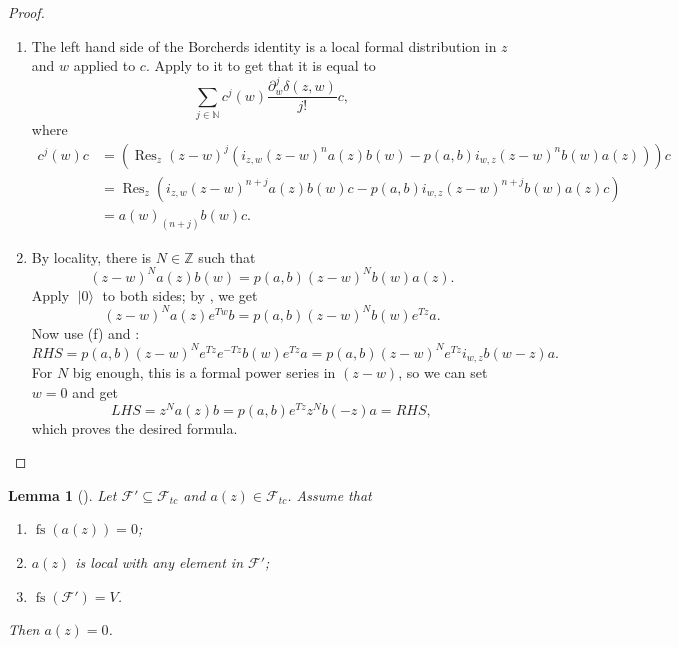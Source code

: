 \documentclass[a4paper, 12pt, reqno]{amsart}
\newtheorem{lemma}[theorem]{Lemma}
\theoremstyle{remark}
\numberwithin{equation}{subsection}
\DeclareMathOperator{\Res}{Res}
\DeclareMathOperator{\vac}{|0\rangle}
\DeclareMathOperator{\fs}{fs}
\begin{document}
\begin{proof}
\begin{enumerate}
  \item The left hand side of the Borcherds identity is a local formal distribution in $z$ and $w$ applied to $c$.
    Apply  to it to get that it is equal to
    \begin{equation*}
      \sum_{j \in \mathbb{N}} c^j(w)\frac{\partial^j_w\delta(z,w)}{j!}c,
    \end{equation*}
    where
    \begin{align*}
      c^j(w)c &= (\Res_z(z - w)^j(i_{z, w}(z - w)^na(z)b(w) - p(a, b)i_{w, z}(z - w)^nb(w)a(z)))c \\
      &= \Res_z(i_{z, w}(z - w)^{n + j}a(z)b(w)c - p(a, b)i_{w, z}(z - w)^{n + j}b(w)a(z)c) \\
      &= a(w)_{(n + j)}b(w)c.
    \end{align*}
  \item By locality, there is $N \in \mathbb{Z}$ such that
    \begin{equation*}
      (z - w)^Na(z)b(w) = p(a, b)(z - w)^Nb(w)a(z).
    \end{equation*}
    Apply $\vac$ to both sides; by , we get
    \begin{equation*}
      (z - w)^Na(z)e^{Tw}b = p(a, b)(z - w)^Nb(w)e^{Tz}a.
    \end{equation*}
    Now use (f) and :
    \begin{equation*}
      RHS = p(a, b)(z - w)^Ne^{Tz}e^{-Tz}b(w)e^{Tz}a = p(a, b)(z - w)^Ne^{Tz}i_{w, z}b(w - z)a.
    \end{equation*}
    For $N$ big enough, this is a formal power series in $(z - w)$, so we can set $w = 0$ and get
    \begin{equation*}
      LHS = z^Na(z)b = p(a, b)e^{Tz}z^Nb(-z)a = RHS,
    \end{equation*}
    which proves the desired formula. \qedhere
  \end{enumerate}
\end{proof}

\begin{lemma}[{\cite[Lemma 3]{callegaro_introduction_2017}}]
  \label{lmm:5}
  Let $\mathcal{F}' \subseteq \mathcal{F}_{tc}$ and $a(z) \in \mathcal{F}_{tc}$.
  Assume that
  \begin{enumerate}
  \item $\fs(a(z)) = 0$;
  \item $a(z)$ is local with any element in $\mathcal{F}'$;
  \item $\fs(\mathcal{F}') = V$.
  \end{enumerate}
  Then $a(z) = 0$.
\end{lemma}
\end{document}
